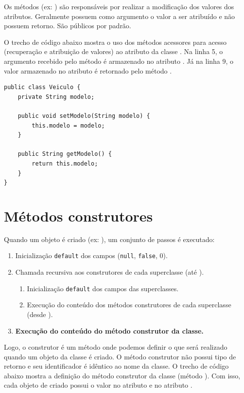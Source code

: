 Os métodos  (ex: ) são responsáveis por realizar a modificação dos valores dos atributos. Geralmente possuem como argumento o valor a ser atribuído e não possuem retorno. São públicos por padrão.

O trecho de código abaixo mostra o uso dos métodos acessores para acesso (recuperação e atribuição de valores) ao atributo  da classe . Na linha 5, o argumento recebido pelo método  é armazenado no atributo . Já na linha 9, o valor armazenado no atributo  é retornado pelo método .

\begin{verbatim}
public class Veiculo {
	private String modelo; 
	
	public void setModelo(String modelo) { 
		this.modelo = modelo; 
	} 
	
	public String getModelo() { 
		return this.modelo; 
	} 
}
\end{verbatim}


\section{Métodos construtores}

Quando um objeto é criado (ex: ), um conjunto de passos é executado:

\begin{enumerate}
	\item Inicialização \texttt{default} dos campos (\texttt{null}, \texttt{false}, 0).
	\item Chamada recursiva aos construtores de cada superclasse (até ).
	\begin{enumerate}
		\item Inicialização \texttt{default} dos campos das superclasses.
		\item Execução do conteúdo dos métodos construtores de cada superclasse (desde ).
	\end{enumerate}
	\item \textbf{Execução do conteúdo do método construtor da classe.}
\end{enumerate}

Logo, o construtor é um método onde podemos definir o que será realizado quando um objeto da classe é criado. O método construtor não possui tipo de retorno e seu identificador é idêntico ao nome da classe. O trecho de código abaixo mostra a definição do método construtor da classe  (método ). Com isso, cada objeto de  criado possui o valor  no atributo  e  no atributo .

